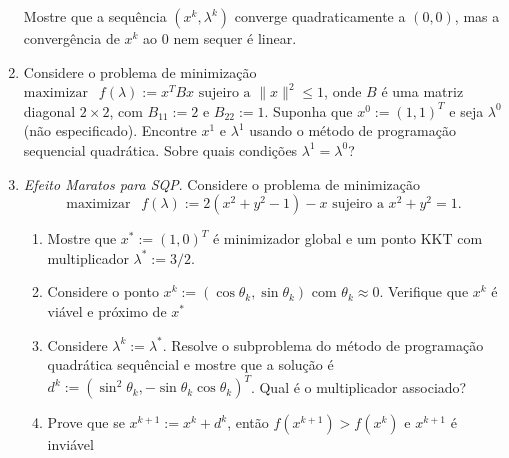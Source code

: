 \documentclass[a4paper,latin]{article}
\begin{document}
\begin{enumerate}
    Mostre que a sequência 
    $(x^k, \lambda^{k})$ converge 
    quadraticamente a $(0,0)$, 
    mas a convergência de $x^k$ ao 
    $0$ nem sequer é linear.   
    \item Considere o problema de minimização 
    $ \text{maximizar } \ \  f(\lambda):=x^{T}Bx
    \text{ sujeiro a } \|x\|^{2}\leq 1$, onde $B$ é uma matriz diagonal $2 \times 2$, com $B_{11}:=2$ e $B_{22}:=1$.
    Suponha que $x^{0}:=(1, 1)^{T}$ e seja 
    $\lambda^{0}$ (não especificado). Encontre $x^1$ e $\lambda^1$ usando o método de programação sequencial quadrática. Sobre quais condições  $\lambda^1=\lambda^0$? 
    \item {\it Efeito Maratos para SQP}.
    Considere o problema de minimização
     $$ \text{maximizar } \ \  f(\lambda):=2(x^2+y^2-1)-x
    \text{ sujeiro a } x^2+y^2=1. $$
      \begin{enumerate}
      \item Mostre que 
      $x^{*}:=(1,0)^{T}$
      é minimizador global e um ponto KKT com multiplicador $\lambda^*:=3/2$.
      \item Considere o ponto 
      $x^{k}:=(\cos \theta_k, \sin \theta_k)$ com $\theta_k \approx 0$.
      Verifique que $x^k$ é viável e próximo de $x^*$
      \item Considere 
      $\lambda^k:=\lambda^*$. Resolve o subproblema do método de programação quadrática sequêncial e mostre que a 
      solução é $d^k:=(\sin^2 \theta_k, 
      -\sin \theta_k \cos \theta_k)^{T}$.
      Qual é o multiplicador associado?
      \item Prove que se 
      $x^{k+1}:=x^k+d^{k}$, então 
      $f(x^{k+1})>f(x^k)$ e 
      $x^{k+1}$ é inviável
      \end{enumerate}
 \end{enumerate}
\end{document}

